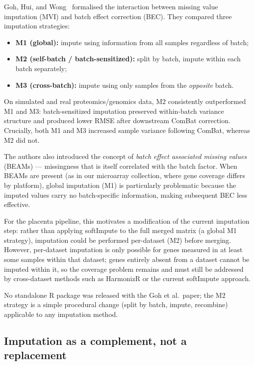\documentclass[11pt,a4paper]{article}
\begin{document}
Goh, Hui, and Wong~\cite{goh2023} formalised the interaction
between missing value imputation (MVI) and batch effect correction
(BEC). They compared three imputation strategies:
\begin{itemize}
  \item \textbf{M1 (global):} impute using information from all
        samples regardless of batch;
  \item \textbf{M2 (self-batch / batch-sensitized):} split by batch,
        impute within each batch separately;
  \item \textbf{M3 (cross-batch):} impute using only samples from
        the \emph{opposite} batch.
\end{itemize}
On simulated and real proteomics/genomics data, M2 consistently
outperformed M1 and M3: batch-sensitized imputation preserved
within-batch variance structure and produced lower RMSE after
downstream ComBat correction. Crucially, both M1 and M3 increased
sample variance following ComBat, whereas M2 did not.

The authors also introduced the concept of \emph{batch effect
associated missing values} (BEAMs) --- missingness that is itself
correlated with the batch factor. When BEAMs are present (as in
our microarray collection, where gene coverage differs by platform),
global imputation (M1) is particularly problematic because the
imputed values carry no batch-specific information, making subsequent
BEC less effective.

For the placenta pipeline, this motivates a modification of the
current imputation step: rather than applying softImpute to the
full merged matrix (a global M1 strategy), imputation could be
performed per-dataset (M2) before merging. However, per-dataset
imputation is only possible for genes measured in at least some
samples within that dataset; genes entirely absent from a dataset
cannot be imputed within it, so the coverage problem remains and
must still be addressed by cross-dataset methods such as HarmonizR
or the current softImpute approach.

No standalone R package was released with the Goh et al.\ paper;
the M2 strategy is a simple procedural change (split by batch,
impute, recombine) applicable to any imputation method.

\subsection{Imputation as a complement, not a replacement}
\end{document}
